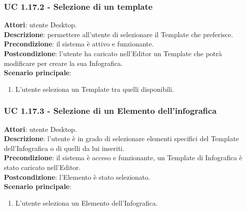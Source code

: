 \subsubsection{UC 1.17.2 - Selezione di un template}{
	\label{uc1.17.2}
	\textbf{Attori}: utente Desktop. \\
	\textbf{Descrizione}: permettere all'utente di selezionare il Template che preferisce. \\
	\textbf{Precondizione}: il sistema è attivo e funzionante.\\
	\textbf{Postcondizione}: l'utente ha caricato nell'Editor un Template che potrà modificare per creare la sua Infografica.\\
	\textbf{Scenario principale}:
	\begin{enumerate}
		\item L'utente seleziona un Template tra quelli disponibili.
	\end{enumerate}	
	}
\subsubsection{UC 1.17.3 - Selezione di un Elemento dell'infografica}{
	\label{uc1.17.3}
	\textbf{Attori}: utente Desktop. \\
	\textbf{Descrizione}: l'utente è in grado di selezionare elementi specifici del Template dell'Infografica o di quelli da lui inseriti. \\
	\textbf{Precondizione}: il sistema è acceso e funzionante, un Template di Infografica è stato caricato nell'Editor.	\\
	\textbf{Postcondizione}: l'Elemento è stato selezionato.\\
	\textbf{Scenario principale}:
	\begin{enumerate}
		\item L'utente seleziona un Elemento dell'Infografica.
	\end{enumerate}		
	}
